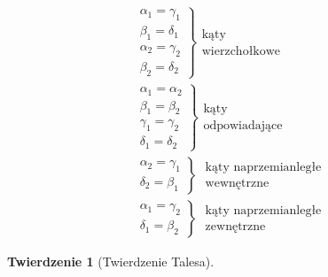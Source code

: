 \documentclass{report}
\newtheorem{theorem}{Twierdzenie}
\begin{document}
    \begin{gather}
      \left.
      \begin{gathered}
        \alpha_1 = \gamma_1\\
        \beta_1 = \delta_1\\
        \alpha_2 = \gamma_2\\
        \beta_2 = \delta_2
      \end{gathered}
      \right\}
      \begin{gathered}
        \text{kąty}\\
        \text{wierzchołkowe}
      \end{gathered}\\
      \left.
      \begin{gathered}
        \alpha_1 = \alpha_2\\
        \beta_1 = \beta_2\\
        \gamma_1 = \gamma_2\\
        \delta_1 = \delta_2
      \end{gathered}
      \right\}
      \begin{gathered}
        \text{kąty}\\
        \text{odpowiadające}
      \end{gathered}\\
      \left.
      \begin{gathered}
        \alpha_2 = \gamma_1\\
        \delta_2 = \beta_1
      \end{gathered}
      \right\}\;
      \begin{gathered}
        \text{kąty naprzemianległe}\\
        \text{wewnętrzne}
      \end{gathered}\\
      \left.
      \begin{gathered}
        \alpha_1 = \gamma_2\\
        \delta_1 = \beta_2
      \end{gathered}
      \right\}\;
      \begin{gathered}
        \text{kąty naprzemianległe}\\
        \text{zewnętrzne}
      \end{gathered}
    \end{gather}
    \begin{theorem}[Twierdzenie Talesa]
      
    \end{theorem}
\end{document}
